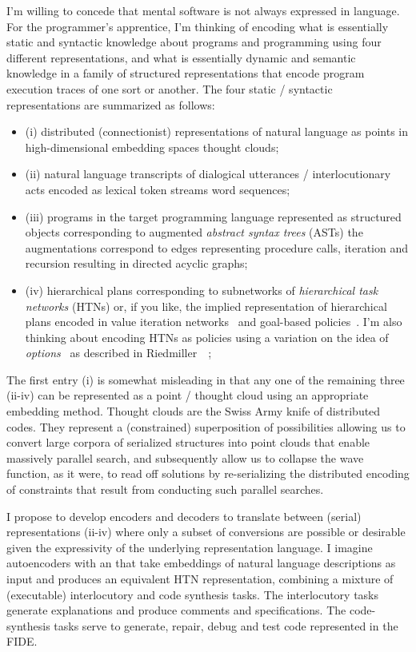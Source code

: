 I'm willing to concede that mental software is not always expressed in language. For the programmer's apprentice, I'm thinking of encoding what is essentially static and syntactic knowledge about programs and programming using four different representations, and what is essentially dynamic and semantic knowledge in a family of structured representations that encode program execution traces of one sort or another. The four static / syntactic representations are summarized as follows:
%
\begin{itemize}
%
\item (i) distributed (connectionist) representations of natural language as points in high-dimensional embedding spaces \emdash{} thought clouds;
%
\item (ii) natural language transcripts of dialogical utterances / interlocutionary acts encoded as lexical token streams \emdash{} word sequences;
%
\item (iii) programs in the target programming language represented as structured objects corresponding to augmented {\it{abstract syntax trees}} (ASTs)\emdash{} the augmentations correspond to edges representing procedure calls, iteration and recursion resulting in directed acyclic graphs;
%
\item (iv) hierarchical plans corresponding to subnetworks of {\it{hierarchical task networks}} (HTNs) or, if you like, the implied representation of hierarchical plans encoded in value iteration networks~\cite{TamaretalNIPS-16} and goal-based policies~\cite{GroshevetalCoRR-17}. I'm also thinking about encoding HTNs as policies using a variation on the idea of {\it{options}}~\cite{SuttonetalAIJ-99} as described in Riedmiller~\etal{}~\cite{RiedmilleretalCoRR-18}; 
%
\end{itemize}

The first entry (i) is somewhat misleading in that any one of the remaining three (ii-iv) can be represented as a point / thought cloud using an appropriate embedding method. Thought clouds are the Swiss Army knife of distributed codes. They represent a (constrained) superposition of possibilities allowing us to convert large corpora of serialized structures into point clouds that enable massively parallel search, and subsequently allow us to collapse the wave function, as it were, to read off solutions by re-serializing the distributed encoding of constraints that result from conducting such parallel searches.

I propose to develop encoders and decoders to translate between (serial) representations (ii-iv) where only a subset of conversions are possible or desirable given the expressivity of the underlying representation language. I imagine autoencoders with an {} that take embeddings of natural language descriptions as input and produces an equivalent HTN representation, combining a mixture of (executable) interlocutory and code synthesis tasks. The interlocutory tasks generate explanations and produce comments and specifications. The code-synthesis tasks serve to generate, repair, debug and test code represented in the FIDE.

